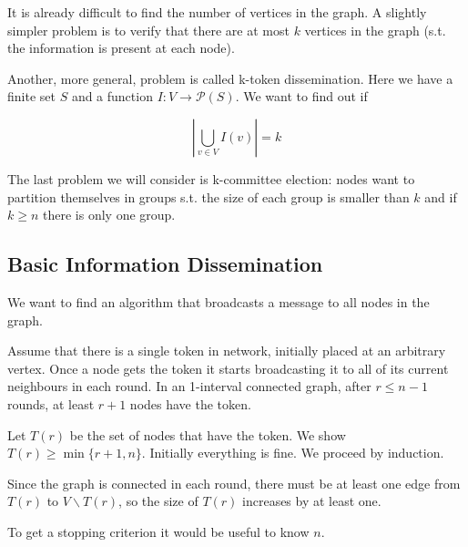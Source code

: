 It is already difficult to find the number of vertices in the graph. A slightly simpler problem is to verify that there are at most $k$ vertices in the graph (s.t. the information is present at each node).

Another, more general, problem is called k-token dissemination. Here we have a finite set $S$ and a function $I:V\rightarrow \mathcal{P}(S)$. We want to find out if 

\[|\bigcup_{v\in V} I(v)| = k\]

The last problem we will consider is k-committee election: nodes want to partition themselves in groups s.t. the size of each group is smaller than $k$ and  if $k\geq n$ there is only one group.

\subsection{Basic Information Dissemination}

We want to find an algorithm that broadcasts a message to all nodes in the graph.

\begin{thm} Assume that there is a single token in network, initially placed at an arbitrary vertex. Once a node gets the token it starts broadcasting it to all of its current neighbours in each round. In an 1-interval connected graph, after $r\leq n-1$ rounds, at least $r+1$ nodes have the token.\end{thm}

\begin{pr} Let $T(r)$ be the set of nodes that have the token. We show $T(r) \geq \min\{r+1,n\}$. Initially everything is fine. We proceed by induction.

Since the graph is connected in each round, there must be at least one edge from $T(r)$ to $V\backslash T(r)$, so the size of $T(r)$ increases by at least one.
\end{pr}

To get a stopping criterion it would be useful to know $n$.
